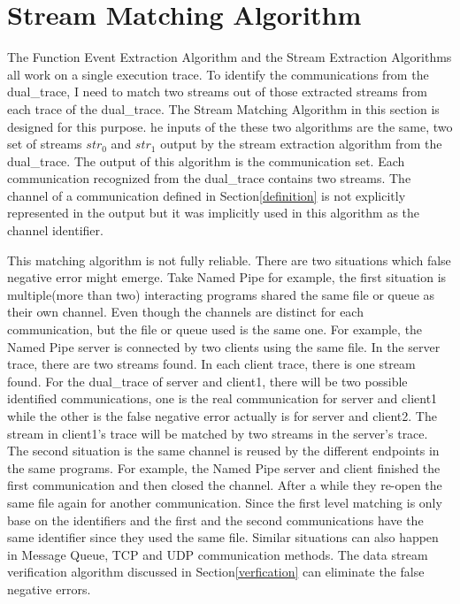 \section{Stream Matching Algorithm}\label{streammatch}
The Function Event Extraction Algorithm and the Stream Extraction Algorithms all work on a single execution trace. To identify the communications from the dual\_trace, I need to match two streams out of those extracted streams from each trace of the dual\_trace. The Stream Matching Algorithm in this section is designed for this purpose. he inputs of the these two algorithms are the same, two set of streams $str_0$ and $str_1$ output by the stream extraction algorithm from the dual\_trace. The output of this algorithm is the communication set. Each communication recognized from the dual\_trace contains two streams. The channel of a communication defined in Section\ref{definition} is not explicitly represented in the output but it was implicitly used in this algorithm as the channel identifier. 

This matching algorithm is not fully reliable. There are two situations which false negative error might emerge. Take Named Pipe for example, the first situation is multiple(more than two) interacting programs shared the same file or queue as their own channel. Even though the channels are distinct for each communication, but the file or queue used is the same one. For example, the Named Pipe server is connected by two clients using the same file. In the server trace, there are two streams found. In each client trace, there is one stream found. For the dual\_trace of server and client1, there will be two possible identified communications, one is the real communication for server and client1 while the other is the false negative error actually is for server and client2. The stream in client1's trace will be matched by two streams in the server's trace. The second situation is the same channel is reused by the different endpoints in the same programs. For example, the Named Pipe server and client finished the first communication and then closed the channel. After a while they re-open the same file again for another communication. Since the first level matching is only base on the identifiers and the first and the second communications have the same identifier since they used the same file. Similar situations can also happen in Message Queue, TCP and UDP communication methods. The data stream verification algorithm discussed in Section\ref{verfication} can eliminate the false negative errors. 

